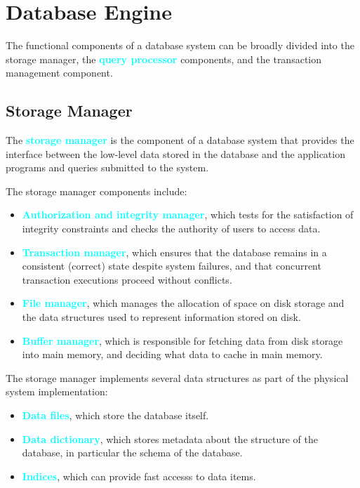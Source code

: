 \documentclass{Beautybook-EN}
\newcommand{\textcy}[1]{\textbf{\textcolor{cyan}{#1}}}
\begin{document}
\section{Database Engine}

The functional components of a database system can be broadly divided into the storage manager, the \textcy{query processor} components, and the transaction management component.

\subsection{Storage Manager}

The \textcy{storage manager} is the component of a database system that provides the interface between the low-level data stored in the database and the application programs and queries submitted to the system.

The storage manager components include:
\begin{itemize}
    \item\textcy{Authorization and integrity manager}, which tests for the satisfaction of integrity constraints and checks the authority of users to access data.
    \item\textcy{Transaction manager}, which ensures that the database remains in a consistent (correct) state despite system failures, and that concurrent transaction executions proceed without conflicts.
    \item\textcy{File manager}, which manages the allocation of space on disk storage and the data structures used to represent information stored on disk.
    \item\textcy{Buffer manager}, which is responsible for fetching data from disk storage into main memory, and deciding what data to cache in main memory.
\end{itemize}

The storage manager implements several data structures as part of the physical system implementation:
\begin{itemize}
    \item\textcy{Data files}, which store the database itself.
    \item\textcy{Data dictionary}, which stores metadata about the structure of the database, in particular the schema of the database.
    \item\textcy{Indices}, which can provide fast accesss to data items.
\end{itemize}
\end{document}
